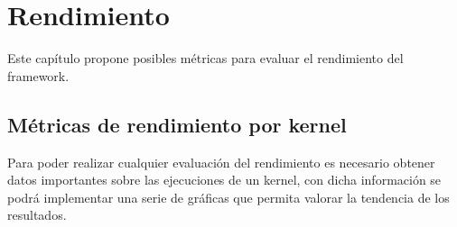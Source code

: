 \chapter{Rendimiento}
    \label{cha:Rendimiento}

Este capítulo propone posibles métricas para evaluar el rendimiento del framework. 

\section{Métricas de rendimiento por kernel}

Para poder realizar cualquier evaluación del rendimiento es necesario obtener datos importantes sobre las ejecuciones de un kernel, con dicha información se podrá implementar una serie de gráficas que permita valorar la tendencia de los resultados.

